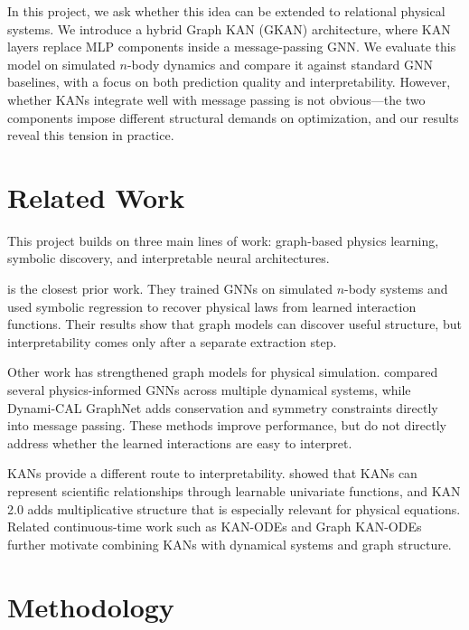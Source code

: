 \documentclass{article}
\begin{document}
In this project, we ask whether this idea can be extended to relational physical systems. We introduce a hybrid Graph KAN (GKAN) architecture, where KAN layers replace MLP components inside a message-passing GNN. We evaluate this model on simulated $n$-body dynamics and compare it against standard GNN baselines, with a focus on both prediction quality and interpretability.  However, whether KANs integrate well with message passing is not obvious---the two components impose different structural demands on optimization, and our results reveal this tension in practice.

\section{Related Work}

This project builds on three main lines of work: graph-based physics learning, symbolic discovery, and interpretable neural architectures.

\cite{cranmer2020discoveringsymbolicmodelsdeep} is the closest prior work. They trained GNNs on simulated $n$-body systems and used symbolic regression to recover physical laws from learned interaction functions. Their results show that graph models can discover useful structure, but interpretability comes only after a separate extraction step.

Other work has strengthened graph models for physical simulation. \cite{thangamuthu2023unravellingperformancephysicsinformedgraph} compared several physics-informed GNNs across multiple dynamical systems, while Dynami-CAL GraphNet \parencite{sharma2025dynamicalgraphnetphysicsinformedgraph} adds conservation and symmetry constraints directly into message passing. These methods improve performance, but do not directly address whether the learned interactions are easy to interpret.

KANs provide a different route to interpretability. \cite{liu2024kankolmogorovarnoldnetworks} showed that KANs can represent scientific relationships through learnable univariate functions, and KAN 2.0 adds multiplicative structure that is especially relevant for physical equations. Related continuous-time work such as KAN-ODEs \parencite{Koenig_2024} and Graph KAN-ODEs \parencite{cappi2025unveilingactualperformanceneuralbased} further motivate combining KANs with dynamical systems and graph structure.

\section{Methodology}
\end{document}
